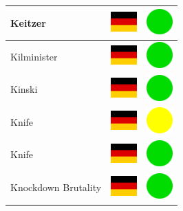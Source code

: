 \documentclass[12pt, a4paper, twoside]{report}
\begin{document}
\begin{center}
\begin{longtable}{|p{5cm}|p{2cm}|p{2cm}|}
Keitzer & \includegraphics[width=1cm]{4x3/de} & \includegraphics[width=1cm]{likes/y} \\ \hline
Kilminister & \includegraphics[width=1cm]{4x3/de} & \includegraphics[width=1cm]{likes/y} \\ \hline
Kinski & \includegraphics[width=1cm]{4x3/de} & \includegraphics[width=1cm]{likes/y} \\ \hline
Knife & \includegraphics[width=1cm]{4x3/de} & \includegraphics[width=1cm]{likes/m} \\ \hline
Knife & \includegraphics[width=1cm]{4x3/de} & \includegraphics[width=1cm]{likes/y} \\ \hline
Knockdown Brutality & \includegraphics[width=1cm]{4x3/de} & \includegraphics[width=1cm]{likes/y} \\ \hline

\end{longtable}
\end{center}
\end{document}
